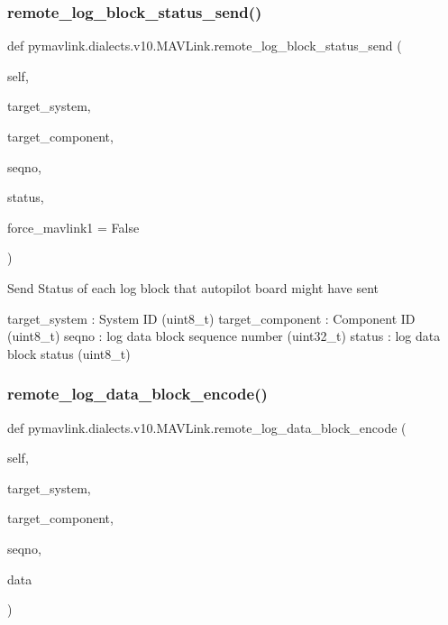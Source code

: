 \begin{DoxyVerb}
\begin{DoxyVerb}
\begin{DoxyVerb}
\begin{DoxyVerb}
\begin{DoxyVerb}
\begin{DoxyVerb}
\begin{DoxyVerb}
\begin{DoxyVerb}
\begin{DoxyVerb}
\begin{DoxyVerb}
\subsubsection{\texorpdfstring{remote\+\_\+log\+\_\+block\+\_\+status\+\_\+send()}{remote\_log\_block\_status\_send()}}
{\footnotesize\ttfamily def pymavlink.\+dialects.\+v10.\+M\+A\+V\+Link.\+remote\+\_\+log\+\_\+block\+\_\+status\+\_\+send (\begin{DoxyParamCaption}\item[{}]{self,  }\item[{}]{target\+\_\+system,  }\item[{}]{target\+\_\+component,  }\item[{}]{seqno,  }\item[{}]{status,  }\item[{}]{force\+\_\+mavlink1 = {\ttfamily False} }\end{DoxyParamCaption})}

\begin{DoxyVerb}Send Status of each log block that autopilot board might have sent

target_system             : System ID (uint8_t)
target_component          : Component ID (uint8_t)
seqno                     : log data block sequence number (uint32_t)
status                    : log data block status (uint8_t)\end{DoxyVerb}
 \mbox{\label{classpymavlink_1_1dialects_1_1v10_1_1MAVLink_ab55b42d3b2f3e0b3c490b0dac3011edf}} 
\subsubsection{\texorpdfstring{remote\+\_\+log\+\_\+data\+\_\+block\+\_\+encode()}{remote\_log\_data\_block\_encode()}}
{\footnotesize\ttfamily def pymavlink.\+dialects.\+v10.\+M\+A\+V\+Link.\+remote\+\_\+log\+\_\+data\+\_\+block\+\_\+encode (\begin{DoxyParamCaption}\item[{}]{self,  }\item[{}]{target\+\_\+system,  }\item[{}]{target\+\_\+component,  }\item[{}]{seqno,  }\item[{}]{data }\end{DoxyParamCaption})}


\end{DoxyVerb}
\end{DoxyVerb}
\end{DoxyVerb}
\end{DoxyVerb}
\end{DoxyVerb}
\end{DoxyVerb}
\end{DoxyVerb}
\end{DoxyVerb}
\end{DoxyVerb}
\end{DoxyVerb}
